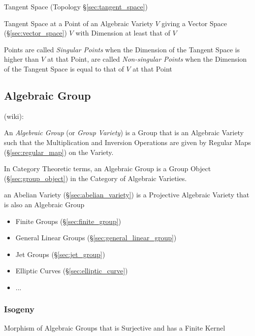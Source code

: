 Tangent Space (Topology \S\ref{sec:tangent_space})

Tangent Space at a Point of an Algebraic Variety $V$ giving a Vector Space
(\S\ref{sec:vector_space}) $V$ with Dimension at least that of $V$

Points are called \emph{Singular Points} when the Dimension of the Tangent
Space is higher than $V$ at that Point, are called \emph{Non-singular Points}
when the Dimension of the Tangent Space is equal to that of $V$ at that Point



\subsection{Algebraic Group}\label{sec:algebraic_group}

(wiki):

An \emph{Algebraic Group} (or \emph{Group Variety}) is a Group that is an
Algebraic Variety such that the Multiplication and Inversion Operations are
given by Regular Maps (\S\ref{sec:regular_map}) on the Variety.

In Category Theoretic terms, an Algebraic Group is a Group Object
(\S\ref{sec:group_object}) in the Category of Algebraic Varieties.

\fist an Abelian Variety (\S\ref{sec:abelian_variety}) is a Projective Algebraic
Variety that is also an Algebraic Group

\begin{itemize}
  \item Finite Groups (\S\ref{sec:finite_group})
  \item General Linear Groups (\S\ref{sec:general_linear_group})
  \item Jet Groups (\S\ref{sec:jet_group})
  \item Elliptic Curves (\S\ref{sec:elliptic_curve})
  \item ...
\end{itemize}



\subsubsection{Isogeny}\label{sec:isogeny}

Morphism of Algebraic Groups that is Surjective and has a Finite Kernel

